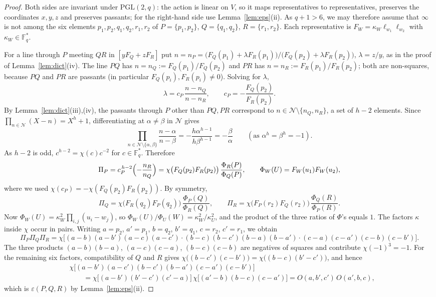 \documentclass[11pt]{amsart}
\theoremstyle{definition}
\theoremstyle{remark}
\numberwithin{equation}{section}
\newcommand{\Fs}{\mathbb{F}_q^{*}}
\newcommand{\PGL}{\mathrm{PGL}(2,q)}
\newcommand{\Ns}{\mathcal{N}}
\begin{document}
\begin{proof}
Both sides are invariant under $\PGL$: the action is linear on $V$, so it maps representatives to representatives, preserves the
coordinates $x,y,z$ and preserves passants; for the right-hand side use Lemma~\ref{lem:eps}(ii). As $q+1>6$, we may therefore
assume that $\infty$ is not among the six elements $p_1,p_2,q_1,q_2,r_1,r_2$ of $P=\{p_1,p_2\}$, $Q=\{q_1,q_2\}$,
$R=\{r_1,r_2\}$. Each representative is $F_W=\kappa_W\ell_{w_1}\ell_{w_2}$ with $\kappa_W\in\Fs$.

For a line through $P$ meeting $QR$ in $[yF_Q+zF_R]$ put $n=n_P=\bigl(F_Q(p_1)+\lambda F_R(p_1)\bigr)/\bigl(F_Q(p_2)+\lambda
F_R(p_2)\bigr)$, $\lambda=z/y$, as in the proof of Lemma~\ref{lem:dict}(iv). The line $PQ$ has $n=n_Q:=F_Q(p_1)/F_Q(p_2)$ and
$PR$ has $n=n_R:=F_R(p_1)/F_R(p_2)$; both are non-squares, because $PQ$ and $PR$ are passants (in particular
$F_Q(p_i),F_R(p_i)\ne0$). Solving for $\lambda$,
\[
\lambda=c_P\,\frac{n-n_Q}{n-n_R},\qquad c_P=-\frac{F_Q(p_2)}{F_R(p_2)} .
\]
By Lemma~\ref{lem:dict}(iii),(iv), the passants through $P$ other than $PQ,PR$ correspond to $n\in\Ns\setminus\{n_Q,n_R\}$, a set of
$h-2$ elements. Since $\prod_{n\in\Ns}(X-n)=X^h+1$, differentiating at $\alpha\ne\beta$ in $\Ns$ gives
\[
\prod_{n\in\Ns\setminus\{\alpha,\beta\}}\frac{n-\alpha}{n-\beta}=-\frac{h\alpha^{h-1}}{h\beta^{h-1}}=-\frac{\beta}{\alpha}
\qquad(\text{as }\alpha^h=\beta^h=-1).
\]
As $h-2$ is odd, $c^{h-2}=\chi(c)c^{-2}$ for $c\in\Fs$. Therefore
\[
\Pi_P=c_P^{\,h-2}\Bigl(-\frac{n_R}{n_Q}\Bigr)=\chi\bigl(F_Q(p_2)F_R(p_2)\bigr)\,\frac{\Phi_R(P)}{\Phi_Q(P)},\qquad
\Phi_W(U)=F_W(u_1)F_W(u_2),
\]
where we used $\chi(c_P)=-\chi(F_Q(p_2)F_R(p_2))$. By symmetry,
\[
\Pi_Q=\chi\bigl(F_R(q_2)F_P(q_2)\bigr)\,\frac{\Phi_P(Q)}{\Phi_R(Q)},\qquad
\Pi_R=\chi\bigl(F_P(r_2)F_Q(r_2)\bigr)\,\frac{\Phi_Q(R)}{\Phi_P(R)}.
\]
Now $\Phi_W(U)=\kappa_W^2\prod_{i,j}(u_i-w_j)$, so $\Phi_W(U)/\Phi_U(W)=\kappa_W^2/\kappa_U^2$, and the product of the three
ratios of $\Phi$'s equals $1$. The factors $\kappa$ inside $\chi$ occur in pairs. Writing $a=p_2$, $a'=p_1$, $b=q_2$, $b'=q_1$,
$c=r_2$, $c'=r_1$, we obtain
\[
\Pi_P\Pi_Q\Pi_R=\chi\bigl[(a-b)(a-b')(a-c)(a-c')\cdot(b-c)(b-c')(b-a)(b-a')\cdot(c-a)(c-a')(c-b)(c-b')\bigr].
\]
The three products $(a-b)(b-a)$, $(a-c)(c-a)$, $(b-c)(c-b)$ are negatives of squares and contribute $\chi(-1)^3=-1$. For the
remaining six factors, compatibility of $Q$ and $R$ gives $\chi\bigl((b-c')(c-b')\bigr)=\chi\bigl((b-c)(b'-c')\bigr)$, and hence
\[
\begin{aligned}
&\chi\bigl[(a-b')(a-c')(b-c')(b-a')(c-a')(c-b')\bigr]\\
&\qquad=\chi\bigl[(a-b')(b'-c')(c'-a)\bigr]\,\chi\bigl[(a'-b)(b-c)(c-a')\bigr]=O(a,b',c')\,O(a',b,c),
\end{aligned}
\]
which is $\varepsilon(P,Q,R)$ by Lemma~\ref{lem:eps}(ii).
\end{proof}
\end{document}
